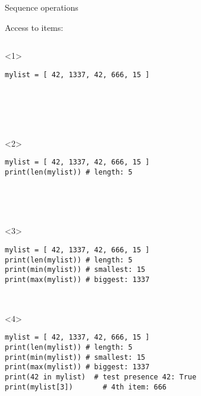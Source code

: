 \begin{frame}[fragile]{Sequence operations}

  \begin{center}

  Access to items:

  \medskip

  \begin{columns}[onlytextwidth]
    \begin{column}{\textwidth}

      \begin{onlyenv}<1>
        \begin{lstlisting}[style=python,morekeywords={for, in, range, list}]
mylist = [ 42, 1337, 42, 666, 15 ]






 \end{lstlisting}
      \end{onlyenv}

      \begin{onlyenv}<2>
        \begin{lstlisting}[style=python,morekeywords={for, in, range, list}]
mylist = [ 42, 1337, 42, 666, 15 ]
print(len(mylist)) # length: 5





 \end{lstlisting}
      \end{onlyenv}

      \begin{onlyenv}<3>
        \begin{lstlisting}[style=python,morekeywords={for, in, range, list}]
mylist = [ 42, 1337, 42, 666, 15 ]
print(len(mylist)) # length: 5
print(min(mylist)) # smallest: 15
print(max(mylist)) # biggest: 1337



 \end{lstlisting}
      \end{onlyenv}

      \begin{onlyenv}<4>
        \begin{lstlisting}[style=python,morekeywords={for, in, range, list}]
mylist = [ 42, 1337, 42, 666, 15 ]
print(len(mylist)) # length: 5
print(min(mylist)) # smallest: 15
print(max(mylist)) # biggest: 1337
print(42 in mylist)  # test presence 42: True
print(mylist[3])       # 4th item: 666


\end{lstlisting}
\end{onlyenv}
\end{column}
\end{columns}
\end{center}
\end{frame}
